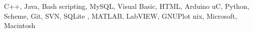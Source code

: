 
\citembullet C++, Java, Bash scripting,  MySQL, Visual Basic, HTML, Arduino uC, Python, Scheme, Git, SVN, SQLite
\citembullet \LaTeXe, MATLAB, LabVIEW, GNUPlot
\citembullet *nix, Microsoft, Macintosh

